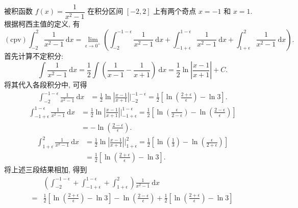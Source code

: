 \begin{solution}
被积函数 $f(x) = \dfrac{1}{x^2 - 1}$ 在积分区间 $[-2, 2]$ 上有两个奇点 $x = -1$ 和 $x = 1.$ 根据柯西主值的定义, 有
\begin{equation*}
(\text{cpv}) \int_{-2}^2 \frac{1}{x^2 - 1} ~ \mathrm{d}x = \lim_{\epsilon \to 0^+} \left( \int_{-2}^{-1-\epsilon} \frac{1}{x^2 - 1} ~ \mathrm{d}x + \int_{-1+\epsilon}^{1-\epsilon} \frac{1}{x^2 - 1} ~ \mathrm{d}x + \int_{1+\epsilon}^{2} \frac{1}{x^2 - 1} ~ \mathrm{d}x \right).
\end{equation*}
首先计算不定积分:
\begin{equation*}
\int \frac{1}{x^2 - 1} ~ \mathrm{d}x = \frac{1}{2} \int \left( \frac{1}{x-1} - \frac{1}{x+1} \right) ~ \mathrm{d}x = \frac{1}{2} \ln \left| \frac{x-1}{x+1} \right| + C.
\end{equation*}
将其代入各段积分中, 可得
\begin{align*}
\int_{-2}^{-1-\epsilon} \frac{1}{x^2 - 1} ~ \mathrm{d}x & = \frac{1}{2} \ln \left| \frac{x-1}{x+1} \right| \bigg|_{-2}^{-1-\epsilon} = \frac{1}{2} \left[ \ln \left( \frac{2+\epsilon}{\epsilon} \right) - \ln 3 \right].
\end{align*}
\begin{align*}
\int_{-1+\epsilon}^{1-\epsilon} \frac{1}{x^2 - 1} ~ \mathrm{d}x & = \frac{1}{2} \ln \left| \frac{x-1}{x+1} \right| \bigg|_{-1+\epsilon}^{1-\epsilon} = \frac{1}{2} \left[ \ln \left( \frac{\epsilon}{2-\epsilon} \right) - \ln \left( \frac{2-\epsilon}{\epsilon} \right) \right] \\
& = -\ln \left( \frac{2-\epsilon}{\epsilon} \right).
\end{align*}
\begin{align*}
\int_{1+\epsilon}^{2} \frac{1}{x^2 - 1} ~ \mathrm{d}x & = \frac{1}{2} \ln \left| \frac{x-1}{x+1} \right| \bigg|_{1+\epsilon}^{2} = \frac{1}{2} \left[ \ln \left( \frac{1}{3} \right) - \ln \left( \frac{\epsilon}{2+\epsilon} \right) \right] \\
& = \frac{1}{2} \left[ \ln \left( \frac{2+\epsilon}{\epsilon} \right) - \ln 3 \right].
\end{align*}
将上述三段结果相加, 得到
\begin{align*}
& \left( \int_{-2}^{-1-\epsilon} + \int_{-1+\epsilon}^{1-\epsilon} + \int_{1+\epsilon}^{2} \right) \frac{1}{x^2 - 1} ~ \mathrm{d}x \\
= & \frac{1}{2} \left[ \ln \left( \frac{2+\epsilon}{\epsilon} \right) - \ln 3 \right] - \ln \left( \frac{2-\epsilon}{\epsilon} \right) + \frac{1}{2} \left[ \ln \left( \frac{2+\epsilon}{\epsilon} \right) - \ln 3 \right] \\

\end{align*}
\end{solution}
